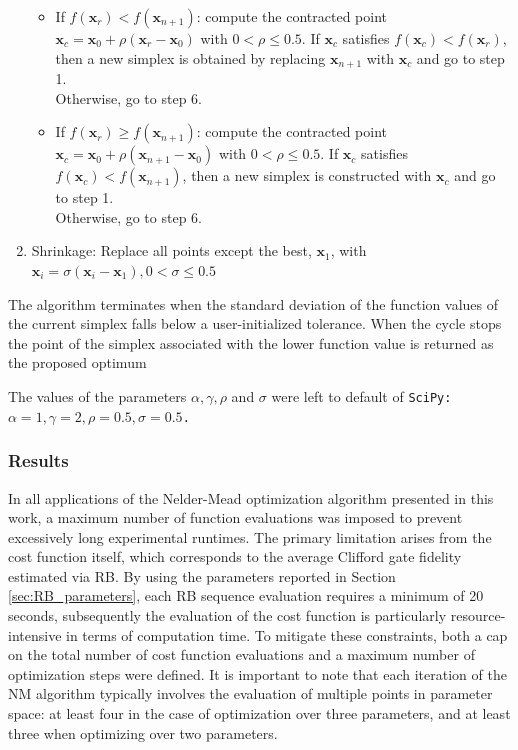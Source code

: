 \begin{enumerate}
\begin{itemize}
        \item If $f(\mathbf{x}_r) < f(\mathbf{x}_{n+1})$: compute the contracted point $\mathbf{x}_c=\mathbf{x}_0 +\rho(\mathbf{x}_{r}-\mathbf{x}_0)$ with $0<\rho \leq 0.5$.
                If $\mathbf{x}_c$ satisfies $f(\mathbf{x}_c) < f(\mathbf{x}_{r})$, then a new simplex is obtained by replacing $\mathbf{x}_{n+1}$ with  $\mathbf{x}_c$ and go to step 1.\\
                Otherwise, go to step 6.
        \item  If $f(\mathbf{x}_r) \geq f(\mathbf{x}_{n+1})$: compute the contracted point $\mathbf{x}_c=\mathbf{x}_0 +\rho(\mathbf{x}_{n+1}-\mathbf{x}_0)$ with $0<\rho \leq 0.5$.
                If $\mathbf{x}_c$ satisfies $f(\mathbf{x}_c) < f(\mathbf{x}_{n+1})$, then a new simplex is constructed with $\mathbf{x}_c$ and go to step 1.\\
                Otherwise, go to step 6.
    \end{itemize}
    \item Shrinkage: Replace all points except the best, $\mathbf{x}_1$, with $\mathbf{x}_i = \sigma(\mathbf{x}_i - \mathbf{x}_1), 0<\sigma \leq 0.5$  
\end{enumerate}
The algorithm terminates when the standard deviation of the function values of the current simplex falls below a user-initialized tolerance. 
When the cycle stops the point of the simplex associated with the lower function value is returned as the proposed optimum

The values of the parameters $\alpha, \gamma, \rho$ and $\sigma$ were left to default of \tt{SciPy}: $\alpha=1, \gamma=2, \rho=0.5, \sigma=0.5$. 

\subsubsection{Results}
In all applications of the Nelder-Mead optimization algorithm presented in this work, a maximum number of function evaluations was imposed to prevent excessively long experimental runtimes. 
The primary limitation arises from the cost function itself, which corresponds to the average Clifford gate fidelity estimated via RB. 
By using the parameters reported in Section \ref{sec:RB_parameters}, each RB sequence evaluation requires a minimum of 20 seconds, subsequently the evaluation of the cost function is particularly resource-intensive in terms of computation time.
To mitigate these constraints, both a cap on the total number of cost function evaluations and a maximum number of optimization steps were defined. 
It is important to note that each iteration of the NM algorithm typically involves the evaluation of multiple points in parameter space: at least four in the case of optimization over three parameters, and at least three when optimizing over two parameters.

